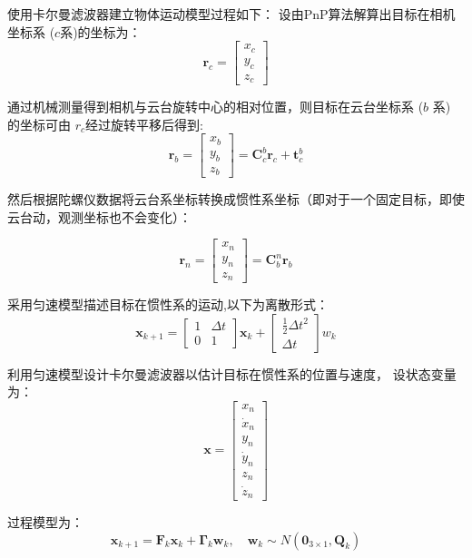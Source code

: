 使用卡尔曼滤波器建立物体运动模型过程如下：
设由PnP算法解算出目标在相机坐标系 ($c$系)的坐标为：
\begin{equation} \boldsymbol r_c=\left[\begin{array}{c} x_c\\ y_c\\ z_c \end{array}\right] \end{equation}
\par 
通过机械测量得到相机与云台旋转中心的相对位置，则目标在云台坐标系 ($b$ 系) 的坐标可由 $r_c$经过旋转平移后得到:
\begin{equation} \boldsymbol r_b=\left[\begin{array}{c} x_b\\ y_b\\ z_b \end{array}\right] =\boldsymbol C_{c}^{b}\boldsymbol r_c + \boldsymbol t_{c}^{b} \end{equation}
\par 
然后根据陀螺仪数据将云台系坐标转换成惯性系坐标（即对于一个固定目标，即使云台动，观测坐标也不会变化）：


\begin{equation} \boldsymbol r_n=\left[\begin{array}{c} x_n\\ y_n\\ z_n \end{array}\right] =\boldsymbol C_{b}^{n}\boldsymbol r_b \end{equation}

\par
采用匀速模型描述目标在惯性系的运动,以下为离散形式：
\begin{equation} \boldsymbol x_{k+1} =\left[\begin{array}{cc} {1} & \Delta t  \\ 0 & {1}  \end{array}\right]\boldsymbol x_{k} + \left[\begin{array}{c} {\frac{1}{2}\Delta t^2} \\ {\Delta t}  \end{array}\right]w_k \end{equation}



利用匀速模型设计卡尔曼滤波器以估计目标在惯性系的位置与速度，
设状态变量为：\begin{equation} \boldsymbol x =\left[\begin{array}{c} x_n\\ \dot x_n\\ y_n\\ \dot y_n\\ z_n\\ \dot z_n \end{array}\right] \end{equation}
\par
过程模型为：\begin{equation} \boldsymbol  x_{k+1} = \boldsymbol F_k\boldsymbol  x_k + \boldsymbol{\Gamma}_{k}\boldsymbol {w}_{k}, \quad \boldsymbol {w}_{k} \sim N\left(\boldsymbol 0_{3 \times 1}, \boldsymbol Q_k \right) \end{equation}

